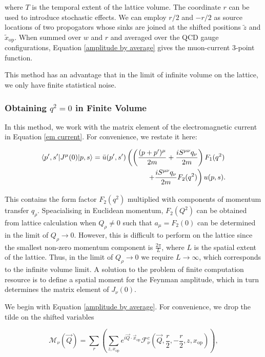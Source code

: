 \documentclass{article}
\numberwithin{equation}{section} %
\begin{document}
\noindent where $T$ is the temporal extent of the lattice volume. The coordinate $r$ can be used to introduce stochastic effects. We can employ $r/2$ and $-r/2$ as source locations of two propogators whose sinks are joined at the shifted positions $\tilde{z}$ and $\tilde{x}_\mathrm{op}$. When summed over $w$ and $r$ and averaged over the QCD gauge configurations, Equation \ref{amplitude by average} gives the muon-current 3-point function. 

This method has an advantage that in the limit of infinite volume on the lattice, we only have finite statistical noise.


\subsubsection{Obtaining $q^2=0$ in Finite Volume}

In this method, we work with the matrix element of the electromagnetic current in Equation \ref{em current}. For convenience, we restate it here:

\begin{equation}
\begin{split}
\mathinner{\langle{p',s'|J^\mu(0)|p,s}\rangle} = \bar{u}(p',s')\left( \left( \frac{(p+p')^\mu }{2m} + \frac{iS^{\mu\nu}q_\nu}{2m} \right) F_1(q^2)\right.&\\
\left. + \frac{iS^{\mu\nu}q_\nu}{2m}F_2(q^2) \right)u(p,s).&
\end{split}
\label{em current (repeated)}
\end{equation}

This contains the form factor $F_2(q^2)$ multiplied with components of momentum transfer $q_\rho$. Speacialising in Euclidean momentum, $F_2(Q^2)$ can be obtained from lattice calculation when $Q_\rho \neq 0$ such that $a_\mu = F_2(0)$ can be determined in the limit of $Q_\rho\rightarrow 0$. However, this is difficult to perform on the lattice since the smallest non-zero momentum component is $\frac{2\pi}{L}$, where $L$ is the spatial extent of the lattice. Thus, in the limit of $Q_\rho \rightarrow 0$ we require $L\rightarrow\infty$, which corresponds to the infinite volume limit. A solution to the problem of finite computation resource is to define a spatial moment for the Feynman amplitude, which in turn determines the matrix element of $J_\nu(0)$.

We begin with Equation \ref{amplitude by average}. For convenience, we drop the tilde on the shifted variables

\begin{equation}
\mathcal{M}_\nu(\vec{Q})= \sum_r\left(\sum_{z,x_\mathrm{op}} e^{i\vec{Q}\cdot\vec{x}_\mathrm{op}} \mathcal{F}^c_\nu(\vec{Q},\frac{r}{2},-\frac{r}{2},z,x_\mathrm{op})\right),
\label{amplitude by average repeated}
\end{equation}
\end{document}
